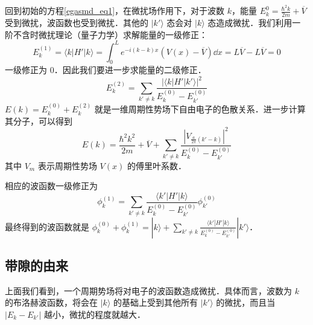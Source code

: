 回到初始的方程\autoref{egasmd_eq1}，在微扰场作用下，对于波数 $k$，能量 $E_k^{0}=\frac{\hbar^2 k}{2m}+\overline V$ 受到微扰，波函数也受到微扰．其他的 $|k'\rangle$ 态会对 $|k\rangle$ 态造成微扰．我们利用一阶不含时微扰理论（量子力学）求解能量的一级修正：
\begin{equation}
E_k^{(1)}=\langle k|H'|k\rangle=\int_0^L e^{-i(k-k)x}(V(x)-\overline V)\dd x=L\overline V-L\overline V=0
\end{equation}
一级修正为 $0$．因此我们要进一步求能量的二级修正．
\begin{equation}
E_k^{(2)}=\sum_{k'\neq k}\frac{|\langle k|H'|k'\rangle|^2}{E_k^{(0)}-E_{k'}^{(0)}}
\end{equation}
$E(k)=E_k^{(0)}+E_k^{(2)}$ 就是一维周期性势场下自由电子的色散关系．进一步计算其分子，可以得到
\begin{equation}
E(k)=\frac{\hbar^2 k^2}{2m}+\overline V+\sum_{k'\neq k} \frac{|V_{\frac{a}{2\pi}(k'-k)}|^2}{E_k^{(0)}-E_{k'}^{(0)}}
\end{equation}
其中 $V_m$ 表示周期性势场 $V(x)$ 的傅里叶系数．

相应的波函数一级修正为
\begin{equation}
\phi_k^{(1)}=\sum_{k'\neq k}\frac{\langle k'|H'|k\rangle}{E_k^{(0)}-E_{k'}^{(0)}} \phi_{k'}^{(0)}
\end{equation}
最终得到的波函数就是 $\phi_k^{(0)}+\phi_k^{(1)}=|k\rangle+\sum_{k'\neq k}\frac{\langle k'|H'|k\rangle}{E_k^{(0)}-E_{k'}^{(0)}} |k'\rangle$．
\subsection{带隙的由来}
上面我们看到，一个周期势场将对电子的波函数造成微扰．具体而言，波数为 $k$ 的布洛赫波函数，将会在 $|k\rangle$ 的基础上受到其他所有 $|k'\rangle$ 的微扰，而且当 $|E_k-E_{k'}|$ 越小，微扰的程度就越大．

